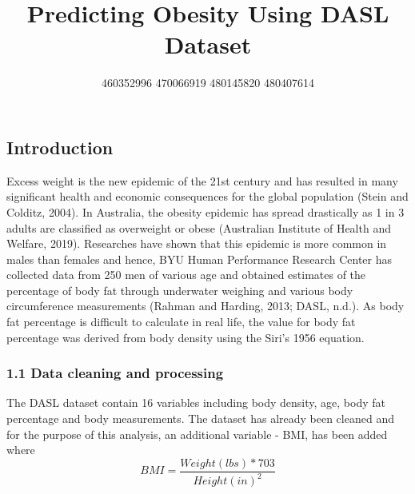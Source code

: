 \documentclass[a4paper,9pt,twocolumn,twoside,]{pinp}
\title{Predicting Obesity Using DASL Dataset}
\author[]{460352996 470066919 480145820 480407614}
\begin{document}
\verticaladjustment{-2pt}

\maketitle
\thispagestyle{firststyle}



\hypertarget{introduction}{%
\subsection{Introduction}\label{introduction}}

Excess weight is the new epidemic of the 21st century and has resulted
in many significant health and economic consequences for the global
population (Stein and Colditz, 2004). In Australia, the obesity epidemic
has spread drastically as 1 in 3 adults are classified as overweight or
obese (Australian Institute of Health and Welfare, 2019). Researches
have shown that this epidemic is more common in males than females and
hence, BYU Human Performance Research Center has collected data from 250
men of various age and obtained estimates of the percentage of body fat
through underwater weighing and various body circumference measurements
(Rahman and Harding, 2013; DASL, n.d.). As body fat percentage is
difficult to calculate in real life, the value for body fat percentage
was derived from body density using the Siri's 1956 equation.

\hypertarget{data-cleaning-and-processing}{%
\subsubsection{1.1 Data cleaning and
processing}\label{data-cleaning-and-processing}}

The DASL dataset contain 16 variables including body density, age, body
fat percentage and body measurements. The dataset has already been
cleaned and for the purpose of this analysis, an additional variable -
BMI, has been added where
\[ BMI = \frac{Weight (lbs)*703}{Height(in)^2} \]
\end{document}
